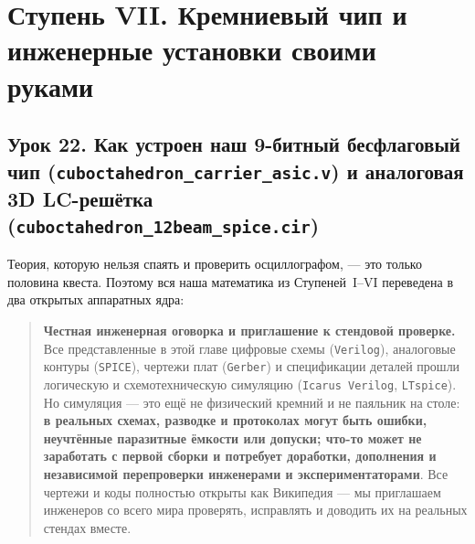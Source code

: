 \chapter{Ступень VII. Кремниевый чип и инженерные установки своими руками}
\label{ch:course-stage7-engineering}

\section{Урок 22. Как устроен наш 9-битный бесфлаговый чип (\texttt{cuboctahedron\_carrier\_asic.v}) и аналоговая 3D LC-решётка (\texttt{cuboctahedron\_12beam\_spice.cir})}

Теория, которую нельзя спаять и проверить осциллографом, --- это только половина квеста. Поэтому вся наша математика из Ступеней~I--VI переведена в два открытых аппаратных ядра:

\begin{quote}
\small\textbf{Честная инженерная оговорка и приглашение к стендовой проверке.}
Все представленные в этой главе цифровые схемы (\texttt{Verilog}), аналоговые контуры (\texttt{SPICE}), чертежи плат (\texttt{Gerber}) и спецификации деталей прошли логическую и схемотехническую симуляцию (\texttt{Icarus Verilog}, \texttt{LTspice}). Но симуляция --- это ещё не физический кремний и не паяльник на столе: \textbf{в реальных схемах, разводке и протоколах могут быть ошибки, неучтённые паразитные ёмкости или допуски; что-то может не заработать с первой сборки и потребует доработки, дополнения и независимой перепроверки инженерами и экспериментаторами}. Все чертежи и коды полностью открыты как Википедия --- мы приглашаем инженеров со всего мира проверять, исправлять и доводить их на реальных стендах вместе.
\end{quote}

